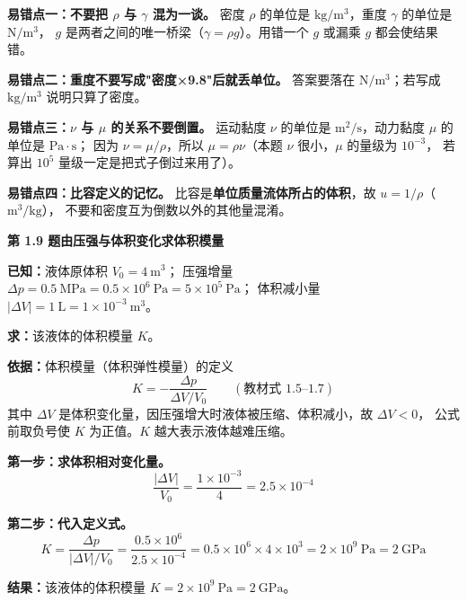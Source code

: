 \begin{yicuo}
\textbf{易错点一：不要把 $\rho$ 与 $\gamma$ 混为一谈。}
密度 $\rho$ 的单位是 $\mathrm{kg/m^3}$，重度 $\gamma$ 的单位是 $\mathrm{N/m^3}$，
$g$ 是两者之间的唯一桥梁（$\gamma=\rho g$）。用错一个 $g$ 或漏乘 $g$ 都会使结果错。

\textbf{易错点二：重度不要写成"密度×9.8"后就丢单位。}
答案要落在 $\mathrm{N/m^3}$；若写成 $\mathrm{kg/m^3}$ 说明只算了密度。

\textbf{易错点三：$\nu$ 与 $\mu$ 的关系不要倒置。}
运动黏度 $\nu$ 的单位是 $\mathrm{m^2/s}$，动力黏度 $\mu$ 的单位是 $\mathrm{Pa\cdot s}$；
因为 $\nu=\mu/\rho$，所以 $\mu=\rho\nu$（本题 $\nu$ 很小，$\mu$ 的量级为 $10^{-3}$，
若算出 $10^{5}$ 量级一定是把式子倒过来用了）。

\textbf{易错点四：比容定义的记忆。}
比容是\textbf{单位质量流体所占的体积}，故 $u=1/\rho$（$\mathrm{m^3/kg}$），
不要和密度互为倒数以外的其他量混淆。
\end{yicuo}

\noindent\textbf{第 1.9 题\quad 由压强与体积变化求体积模量}

\begin{jie}
\textbf{已知：}液体原体积 $V_0=4\ \mathrm{m^3}$；
压强增量 $\Delta p=0.5\ \mathrm{MPa}=0.5\times10^{6}\ \mathrm{Pa}=5\times10^{5}\ \mathrm{Pa}$；
体积减小量 $|\Delta V|=1\ \mathrm{L}=1\times10^{-3}\ \mathrm{m^3}$。

\textbf{求：}该液体的体积模量 $K$。

\textbf{依据：}体积模量（体积弹性模量）的定义
\[ K=-\frac{\Delta p}{\Delta V/V_0}\qquad(\text{教材式 1.5--1.7}) \]
其中 $\Delta V$ 是体积变化量，因压强增大时液体被压缩、体积减小，故 $\Delta V<0$，
公式前取负号使 $K$ 为正值。$K$ 越大表示液体越难压缩。

\textbf{第一步：求体积相对变化量。}
\[ \frac{|\Delta V|}{V_0}=\frac{1\times10^{-3}}{4}=2.5\times10^{-4} \]

\textbf{第二步：代入定义式。}
\[ K=\frac{\Delta p}{|\Delta V|/V_0}
   =\frac{0.5\times10^{6}}{2.5\times10^{-4}}
   =0.5\times10^{6}\times4\times10^{3}
   =2\times10^{9}\ \mathrm{Pa}=2\ \mathrm{GPa} \]

\textbf{结果：}该液体的体积模量 $K=2\times10^{9}\ \mathrm{Pa}=2\ \mathrm{GPa}$。
\end{jie}


